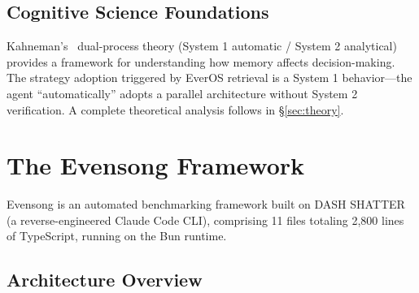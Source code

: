 \documentclass[11pt, a4paper]{article}
\begin{document}
\subsection{Cognitive Science Foundations}

Kahneman's~\cite{kahneman2011thinking} dual-process theory (System 1 automatic / System 2 analytical) provides a framework for understanding how memory affects decision-making. The strategy adoption triggered by EverOS retrieval is a System 1 behavior---the agent ``automatically'' adopts a parallel architecture without System 2 verification. A complete theoretical analysis follows in \S\ref{sec:theory}.

\section{The Evensong Framework}

Evensong is an automated benchmarking framework built on DASH SHATTER~\cite{zhu2026dashshatter} (a reverse-engineered Claude Code CLI), comprising 11 files totaling 2{,}800 lines of TypeScript, running on the Bun runtime.

\subsection{Architecture Overview}
\end{document}
